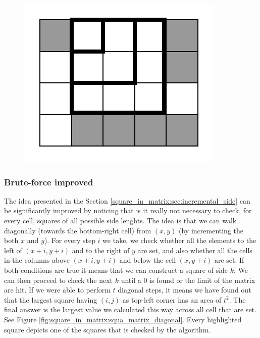 \begin{figure}
	\centering
	\label{fig:square_in_matrix:squa_matrix_incremental}
	\includegraphics[width=\textwidth/2]{sources/square_in_matrix/images/squa_matrix_incremental}
	\caption[]{}
\end{figure}

\subsubsection{Brute-force improved}
The idea presented in the Section \ref{square_in_matrix:sec:incremental_side} can be significantly
improved by noticing that is it really not necessary to check, for every cell, squares of all
possible side lenghts. The idea is that we can walk diagonally (towards the bottom-right cell) from
$(x,y)$ (by incrementing the both $x$ and $y$). For every step $i$ we take, we check whether all the
elements to the left of $(x+i, y+i)$  and to the right of  $y$ are set, and also whether all the
cells in the columns above $(x+i, y+i)$ and below the cell $(x,y+i)$ are set. If both conditions are
true it means that we can construct a square of side $k$. We can then proceed to check the next $k$
until a $0$ is found or the limit of the matrix are hit. If we were able to perform $t$ diagonal
steps, it means we have found out that the largest square having $(i,j)$ as top-left corner has an
area of $t^2$. The final answer is the largest value we calculated this way across all cell that are
set. See Figure \ref{fig:square_in_matrix:squa_matrix_diagonal}. Every highlighted square depicts
one of the squares that is checked by the algorithm.



